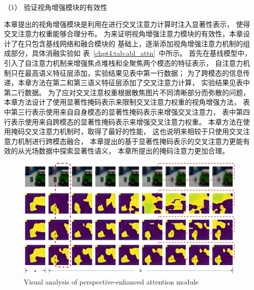 （1）
验证视角增强模块的有效性


本章提出的视角增强模块是利用在进行交叉注意力计算时注入显著性表示，
使得交叉注意力权重能够合理分布。
为来证明视角增强注意力模块的有效性，本章设计了在只包含基线网络和融合模块的
基础上，逐渐添加视角增强注意力机制的组成部分，具体消融实验如
表~\ref{chpt4:tab:abl_attn}~中所示。
首先在基线模型中，引入了自注意力机制来增强焦点堆栈和全聚焦两个模态的特征表示，
自注意力机制只在最高语义特征层添加，实验结果见表中第一行数据；
为了跨模态的信息传递，本章方法在第二和第三语义特征层添加了交叉注意力计算，
实验结果见表中第二行数据。
为了应对交叉注意权重根据散焦图片不同清晰部分而弥散的问题，
本章方法设计了使用显著性掩码表示来限制交叉注意力权重的视角增强方法，
表中第三行表示使用来自自身模态的显著性掩码表示来增强交叉注意力，
表中第四行表示使用来自跨模态的显著性掩码表示来增强交叉注意力权重。
本章方法在使用掩码交叉注意力机制时，取得了最好的性能，
这也说明来相较于只使用交叉注意力机制进行跨模态融合，
本章提出的基于显著性掩码表示的交叉注意力更能有效的从光场数据中探索显著性语义，
本章所提出的掩码注意力更加合理。


\begin{figure}[!ht]
	\centering
	\includegraphics[width=\linewidth]{figures/chapter4/attn_show}
	{Visual analysis of perspective-enhanced attention module}
	\label{chpt4:figure:attn_show}
\end{figure}


